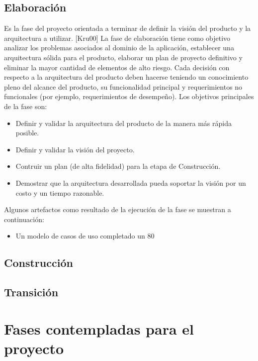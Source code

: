 \subsection{Elaboración}
Es la fase del proyecto orientada a terminar de definir la visión del producto y la arquitectura a utilizar. [Kru00] La fase de elaboración tiene como objetivo analizar los problemas asociados al dominio de la aplicación, establecer una arquitectura sólida para el producto, elaborar un plan de proyecto definitivo y eliminar la mayor cantidad de elementos de alto riesgo. Cada decisión con respecto a la arquitectura del producto deben hacerse teniendo un conocimiento pleno del alcance del producto, su funcionalidad principal  y requerimientos no funcionales (por ejemplo, requerimientos de desempeño).
Los objetivos principales de la fase son:
\begin{itemize}
\item Definir y validar la arquitectura del producto de la manera más  rápida posible.
\item Definir y validar la visión del proyecto.
\item Contruir un plan (de alta fidelidad) para la etapa de Construcción.
\item Demostrar que la arquitectura desarrollada pueda soportar la visión por un costo y un tiempo razonable.
\end{itemize}
Algunos artefactos como resultado de la ejecución de la fase se muestran a continuación:
\begin{itemize}
\item Un modelo de casos de uso completado un 80   
\end{itemize}
\subsection{Construcción}
\subsection{Transición}

\section{Fases contempladas para el proyecto}